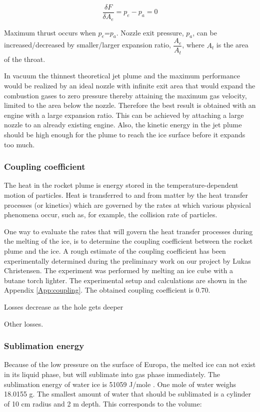 \begin{equation}
\dfrac{\delta F}{\delta A_e}=p_e-p_a=0 
\end{equation}

Maximum thrust occurs when $p_e$=$p_a$. Nozzle exit pressure, $p_a$, can be increased/decreased by smaller/larger expansion ratio, $\dfrac{A_e}{A_t}$, where $A_t$ is the area of the throat. 

In vacuum the thinnest theoretical jet plume and the maximum performance would be realized by an ideal nozzle with infinite exit area that would expand the combustion gases to zero pressure thereby attaining the maximum gas velocity, limited to the area below the nozzle. Therefore the best result is obtained with an engine with a large expansion ratio. This can be achieved by attaching a large nozzle to an already existing engine. Also, the kinetic energy in the jet plume should be high enough for the plume to reach the ice surface before it expands too much. 


\subsubsection{Coupling coefficient}
The heat in the rocket plume is energy stored in the temperature-dependent motion of particles. Heat is transferred to and from matter by the heat transfer processes (or kinetics) which are governed by the rates at which various physical phenomena occur, such as, for example, the collision rate of particles. 

One way to evaluate the rates that will govern the heat transfer processes during the melting of the ice, is to determine the coupling coefficient between the rocket plume and the ice. A rough estimate of the coupling coefficient has been experimentally determined during the preliminary work on our project by Lukas Christensen. The experiment was performed by melting an ice cube with a butane torch lighter. The experimental setup and calculations are shown in the Appendix \ref{App:coupling}. The obtained coupling coefficient is 0.70.


Losses decrease as the hole gets deeper

Other losses. 

\subsubsection{Sublimation energy}

Because of the low pressure on the surface of Europa, the melted ice can not exist in its liquid phase, but will sublimate into gas phase immediately. The sublimation energy of water ice is 51059 J/mole \cite{ice properties}. One mole of water weighs 18.0155 g. The smallest amount of water that should be sublimated is a cylinder of 10 cm radius and 2 m depth. This corresponds to the volume:

